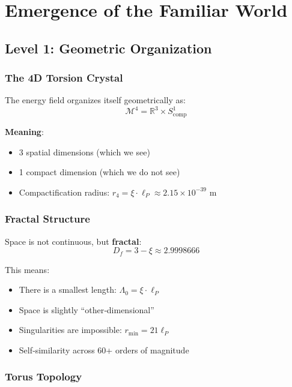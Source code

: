 	\section{Emergence of the Familiar World}
	
	\subsection{Level 1: Geometric Organization}
	
	\subsubsection{The 4D Torsion Crystal}
	
	The energy field organizes itself geometrically as:
	\begin{equation}
		\mathcal{M}^4 = \mathbb{R}^3 \times S^1_{\text{comp}}
	\end{equation}
	
	\textbf{Meaning}:
	\begin{itemize}
		\item 3 spatial dimensions (which we see)
		\item 1 compact dimension (which we do not see)
		\item Compactification radius: $r_4 = \xi \cdot \ell_P \approx 2.15 \times 10^{-39}$ m
	\end{itemize}
	
	\subsubsection{Fractal Structure}
	
	Space is not continuous, but \textbf{fractal}:
	\begin{equation}
		D_f = 3 - \xi \approx 2.9998666
	\end{equation}
	
	This means:
	\begin{itemize}
		\item There is a smallest length: $\Lambda_0 = \xi \cdot \ell_P$
		\item Space is slightly \enquote{other‑dimensional}
		\item Singularities are impossible: $r_{\min} = 21\ell_P$
		\item Self‑similarity across 60+ orders of magnitude
	\end{itemize}
	
	\subsubsection{Torus Topology}
	
